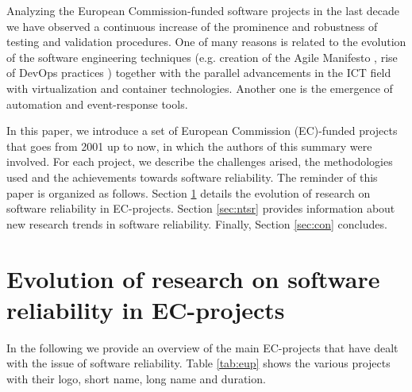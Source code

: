 \documentclass[journal]{IEEEtran}
\begin{document}
Analyzing the European Commission-funded software projects in the last decade
we have observed a continuous increase of the prominence and robustness of
testing and validation procedures. One of many reasons is related to the
evolution of the software engineering techniques (e.g. creation of the Agile
Manifesto \cite{agile-manifesto}, rise of DevOps practices \cite{zhu}) together
with the parallel advancements in the ICT field with virtualization and
container technologies. Another one is the emergence of automation and
event-response tools.

In this paper, we introduce a set of European Commission (EC)-funded projects
that goes from 2001 up to now, in which the authors of this summary were involved.
For each project, we describe the challenges arised, the methodologies used and
the achievements towards software reliability. The reminder of this paper is
organized as follows. Section \ref{sec:ev} details the evolution of research on
software reliability in EC-projects.  Section \ref{sec:ntsr} provides
information about new research trends in software reliability. Finally,
Section \ref{sec:con} concludes.

\section{Evolution of research on software reliability in EC-projects}
\label{sec:ev}

In the following we provide an overview of the main EC-projects that have dealt with 
the issue of software reliability. Table \ref{tab:eup} shows the various projects 
with their logo, short name, long name and duration.
\end{document}

